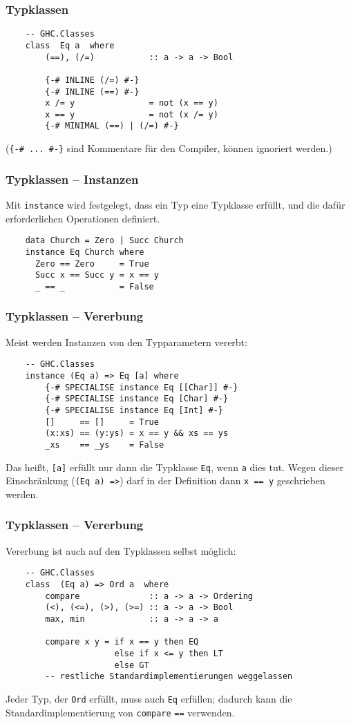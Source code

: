 \documentclass{beamer}
\begin{document}
\begin{frame}[fragile]
  \frametitle{Typklassen}
  \begin{lstlisting}
    -- GHC.Classes
    class  Eq a  where
        (==), (/=)           :: a -> a -> Bool
        
        {-# INLINE (/=) #-}
        {-# INLINE (==) #-}
        x /= y               = not (x == y)
        x == y               = not (x /= y)
        {-# MINIMAL (==) | (/=) #-}
  \end{lstlisting}
  (\lstinline!{-# ... #-}! sind Kommentare für den Compiler, können ignoriert werden.)
\end{frame}

\begin{frame}[fragile]
  \frametitle{Typklassen – Instanzen}
  Mit \lstinline{instance} wird festgelegt, dass ein Typ eine Typklasse erfüllt,
  und die dafür erforderlichen Operationen definiert.
  \begin{lstlisting}
    data Church = Zero | Succ Church
    instance Eq Church where
      Zero == Zero     = True
      Succ x == Succ y = x == y
      _ == _           = False
  \end{lstlisting}
\end{frame}

\begin{frame}[fragile]
  \frametitle{Typklassen – Vererbung}
  Meist werden Instanzen von den Typparametern vererbt:
  \begin{lstlisting}
    -- GHC.Classes
    instance (Eq a) => Eq [a] where
        {-# SPECIALISE instance Eq [[Char]] #-}
        {-# SPECIALISE instance Eq [Char] #-}
        {-# SPECIALISE instance Eq [Int] #-}
        []     == []     = True
        (x:xs) == (y:ys) = x == y && xs == ys
        _xs    == _ys    = False
  \end{lstlisting}
  Das heißt, \lstinline{[a]} erfüllt nur dann die Typklasse \lstinline{Eq}, wenn \lstinline{a} dies tut.
  Wegen dieser Einschränkung (\lstinline{(Eq a) =>}) darf in der Definition dann \lstinline{x == y} geschrieben werden.
\end{frame}

\begin{frame}[fragile]
  \frametitle{Typklassen – Vererbung}
  Vererbung ist auch auf den Typklassen selbst möglich:
  \begin{lstlisting}
    -- GHC.Classes
    class  (Eq a) => Ord a  where
        compare              :: a -> a -> Ordering
        (<), (<=), (>), (>=) :: a -> a -> Bool
        max, min             :: a -> a -> a
    
        compare x y = if x == y then EQ
                      else if x <= y then LT
                      else GT
        -- restliche Standardimplementierungen weggelassen
  \end{lstlisting}
  Jeder Typ, der \lstinline{Ord} erfüllt, muss auch \lstinline{Eq} erfüllen;
  dadurch kann die Standardimplementierung von \lstinline{compare} \lstinline{==} verwenden.
\end{frame}
\end{document}
